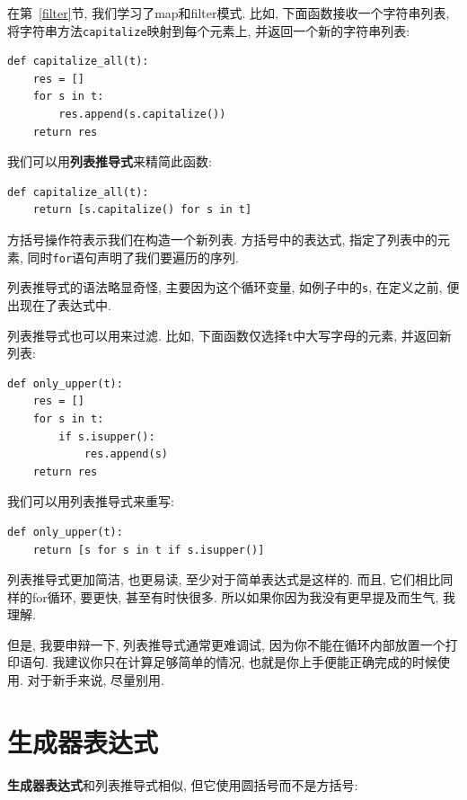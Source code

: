 \documentclass[10pt]{book}
\begin{document}
在第~\ref{filter}节, 我们学习了map和filter模式. 
比如, 下面函数接收一个字符串列表, 将字符串方法{\tt capitalize}映射到每个元素上, 
并返回一个新的字符串列表:

\begin{verbatim}
def capitalize_all(t):
    res = []
    for s in t:
        res.append(s.capitalize())
    return res
\end{verbatim}

我们可以用{\bf 列表推导式}来精简此函数:

\begin{verbatim}
def capitalize_all(t):
    return [s.capitalize() for s in t]
\end{verbatim}

方括号操作符表示我们在构造一个新列表. 
方括号中的表达式, 指定了列表中的元素, 同时{\tt for}语句声明了我们要遍历的序列. 

列表推导式的语法略显奇怪, 主要因为这个循环变量, 如例子中的{\tt s}, 在定义之前, 
便出现在了表达式中. 

列表推导式也可以用来过滤. 
比如, 下面函数仅选择{\tt t}中大写字母的元素, 并返回新列表:

\begin{verbatim}
def only_upper(t):
    res = []
    for s in t:
        if s.isupper():
            res.append(s)
    return res
\end{verbatim}

我们可以用列表推导式来重写:

\begin{verbatim}
def only_upper(t):
    return [s for s in t if s.isupper()]
\end{verbatim}

列表推导式更加简洁, 也更易读, 至少对于简单表达式是这样的. 
而且, 它们相比同样的for循环, 要更快, 甚至有时快很多. 
所以如果你因为我没有更早提及而生气, 我理解. 

但是, 我要申辩一下, 列表推导式通常更难调试, 
因为你不能在循环内部放置一个打印语句. 
我建议你只在计算足够简单的情况, 也就是你上手便能正确完成的时候使用. 
对于新手来说, 尽量别用. 



\section{生成器表达式}

{\bf 生成器表达式}和列表推导式相似, 但它使用圆括号而不是方括号:
\end{document}
